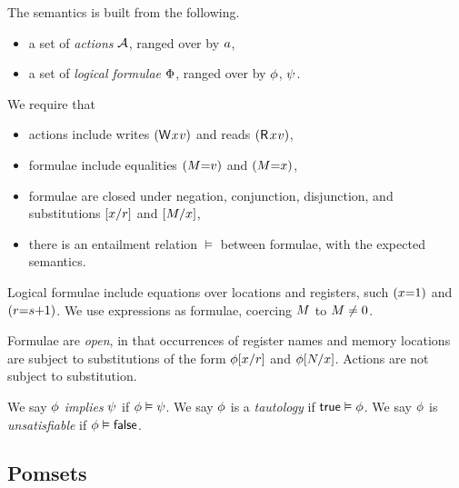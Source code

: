 The semantics is built from the following.
\begin{itemize}
\item a set of \emph{actions} $\mathcal{A}$, ranged over by $a$, 
\item a set of \emph{logical formulae} $\Phi$, ranged over by $\phi$,
  $\psi$.
\end{itemize}
We require that
\begin{itemize}
\item actions include writes $\DWP{\aLoc}{\aVal}$ and reads $\DRP{\aLoc}{\aVal}$,
\item formulae include equalities $(M{=}v)$ and $(M{=}x)$,
\item formulae are closed under negation, conjunction, disjunction, and
  substitutions $[x/r]$ and $[M/x]$, 
\item there is an entailment relation $\vDash$ between formulae, with the
  expected semantics.
\end{itemize}


Logical formulae include equations over locations and registers, such
$(x{=}1)$ and $(r{=}s{+}1)$.
We use expressions as formulae, coercing $M$ to $M\neq 0$.

Formulae are \emph{open}, in that occurrences of register names and memory
locations are subject to substitutions of the form $\phi[x/r]$ and
$\phi[N/x]$.  Actions are not subject to substitution.

  We say
  $\phi$ \emph{implies} $\psi$ if $\phi\vDash\psi$.
  We say
  $\phi$ is a \emph{tautology} if $\mathsf{true}\vDash\phi$.
  We say
  $\phi$ is \emph{unsatisfiable} if $\phi\vDash\mathsf{false}$.

\subsection{Pomsets}

